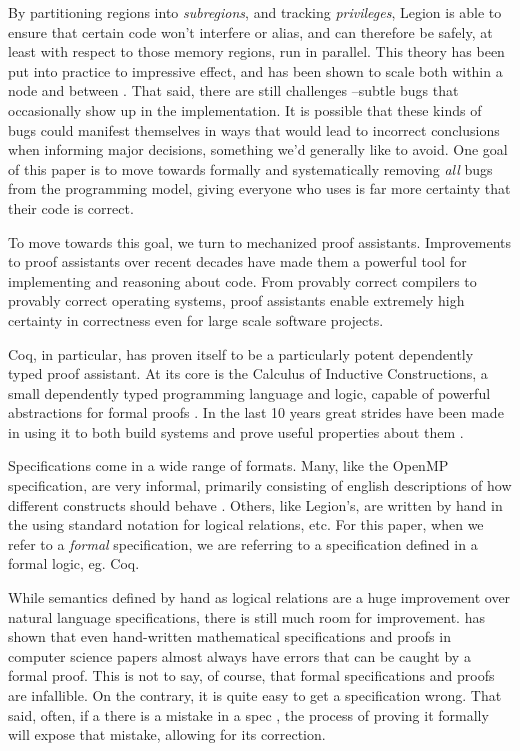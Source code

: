 \documentclass[sigconf]{acmart}
\begin{document}
By partitioning regions into \emph{subregions}, and tracking \emph{privileges}, 
Legion is able to ensure that certain code won't interfere or alias, and can
therefore be safely, at least with respect to those memory regions, run in
parallel. This theory has been put into practice to impressive effect, and has
been shown to scale both within a node and between \cite{bauer2012legion, treichler2014realm}. That
said, there are still challenges --subtle bugs that occasionally show up in the
implementation. It is possible that these kinds of bugs could manifest
themselves in ways that would lead to incorrect conclusions when informing
major decisions, something we'd generally like to avoid. One goal of this paper
is to move towards formally and systematically removing \emph{all} bugs from
the programming model, giving everyone who uses is far more certainty that 
their code is correct.

To move towards this goal, we turn to mechanized proof assistants.
Improvements to proof assistants over recent decades have made them a powerful
tool for implementing and reasoning about code. From provably correct compilers
to provably correct operating systems, proof assistants enable extremely high
certainty in correctness even for large scale software projects. 

Coq, in particular, has proven itself to be a particularly potent dependently
typed proof assistant. At its core is the Calculus of Inductive Constructions,
a small dependently typed programming language and logic, capable of powerful
abstractions for formal proofs \cite{bertot2013interactive}. In the last 10 years great strides
have been made in using it to both build systems and prove useful properties
about them \cite{leroy2012compcert, anand2017certicoq, chlipala2009effective}. 

Specifications come in a wide range of formats. Many, like the OpenMP
specification, are very informal, primarily consisting of english descriptions
of how different constructs should behave \cite{dagum1998openmp}. Others, like Legion's,
are written by hand in the using standard notation for logical relations, etc.
For this paper, when we refer to a \emph{formal} specification, we are
referring to a specification defined in a formal logic, eg. Coq. 

While semantics defined by hand as logical relations are a huge improvement
over natural language specifications, there is still much room for improvement.
\cite{formalspec vs paper} has shown that even hand-written mathematical
specifications and proofs in computer science papers almost always have errors
that can be caught by a formal proof.  This is not to say, of course, that
formal specifications and proofs are infallible.  On the contrary, it is quite
easy to get a specification wrong. That said, often, if a there is a mistake in
a spec , the process of proving it formally will expose that mistake, allowing
for its correction.  
\end{document}
